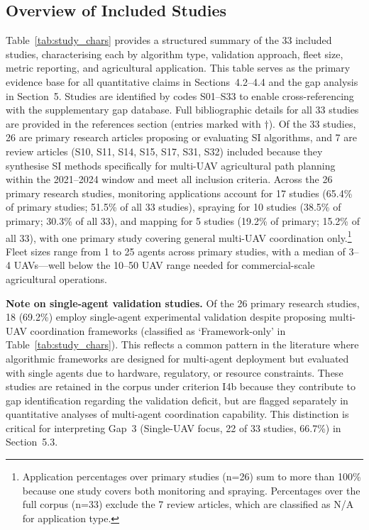 \documentclass[review,3p,times]{elsarticle}
\begin{document}
\subsection{Overview of Included Studies}
Table~\ref{tab:study_chars} provides a structured summary of the 33 included studies, characterising each by algorithm type, validation approach, fleet size, metric reporting, and agricultural application. This table serves as the primary evidence base for all quantitative claims in Sections~4.2--4.4 and the gap analysis in Section~5. Studies are identified by codes S01--S33 to enable cross-referencing with the supplementary gap database. Full bibliographic details for all 33 studies are provided in the references section (entries marked with $\dagger$). Of the 33 studies, 26 are primary research articles proposing or evaluating SI algorithms, and 7 are review articles (S10, S11, S14, S15, S17, S31, S32) included because they synthesise SI methods specifically for multi-UAV agricultural path planning within the 2021--2024 window and meet all inclusion criteria. Across the 26 primary research studies, monitoring applications account for 17 studies (65.4\% of primary studies; 51.5\% of all 33 studies), spraying for 10 studies (38.5\% of primary; 30.3\% of all 33), and mapping for 5 studies (19.2\% of primary; 15.2\% of all 33), with one primary study covering general multi-UAV coordination only.\footnote{Application percentages over primary studies (n=26) sum to more than 100\% because one study covers both monitoring and spraying. Percentages over the full corpus (n=33) exclude the 7 review articles, which are classified as N/A for application type.} Fleet sizes range from 1 to 25 agents across primary studies, with a median of 3--4 UAVs---well below the 10--50 UAV range needed for commercial-scale agricultural operations.

\textbf{Note on single-agent validation studies.} Of the 26 primary research studies, 18 (69.2\%) employ single-agent experimental validation despite proposing multi-UAV coordination frameworks (classified as `Framework-only' in Table~\ref{tab:study_chars}). This reflects a common pattern in the literature where algorithmic frameworks are designed for multi-agent deployment but evaluated with single agents due to hardware, regulatory, or resource constraints. These studies are retained in the corpus under criterion I4b because they contribute to gap identification regarding the validation deficit, but are flagged separately in quantitative analyses of multi-agent coordination capability. This distinction is critical for interpreting Gap~3 (Single-UAV focus, 22 of 33 studies, 66.7\%) in Section~5.3.
\end{document}
